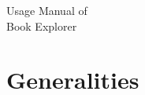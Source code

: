 \documentclass[12pt,a4paper]{article}
\begin{document}
    
    \begin{titlepage}
        \vspace*{\fill}
        \begin{center}
            {\Huge Usage Manual of\\Book Explorer}
        \end{center}
        \vspace*{\fill}
    \end{titlepage}

    \newpage

    \tableofcontents

    \newpage

    \section{Generalities}
\end{document}
